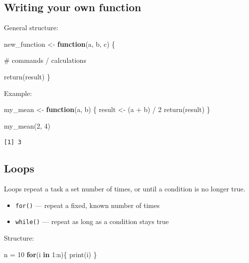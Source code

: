 \documentclass[
  letterpaper,
  DIV=11,
  numbers=noendperiod]{scrartcl}
\newenvironment{Shaded}{\begin{snugshade}}{\end{snugshade}}
\newcommand{\CommentTok}[1]{\textcolor[rgb]{0.37,0.37,0.37}{#1}}
\newcommand{\ControlFlowTok}[1]{\textcolor[rgb]{0.00,0.23,0.31}{\textbf{#1}}}
\newcommand{\DecValTok}[1]{\textcolor[rgb]{0.68,0.00,0.00}{#1}}
\newcommand{\FunctionTok}[1]{\textcolor[rgb]{0.28,0.35,0.67}{#1}}
\newcommand{\NormalTok}[1]{\textcolor[rgb]{0.00,0.23,0.31}{#1}}
\newcommand{\OtherTok}[1]{\textcolor[rgb]{0.00,0.23,0.31}{#1}}
\newcommand{\SpecialCharTok}[1]{\textcolor[rgb]{0.37,0.37,0.37}{#1}}
\providecommand{\tightlist}{%
  \setlength{\itemsep}{0pt}\setlength{\parskip}{0pt}}
\begin{document}
\subsection{Writing your own function}\label{writing-your-own-function}

General structure:

\begin{Shaded}
\begin{Highlighting}[]
\NormalTok{new\_function }\OtherTok{\textless{}{-}} \ControlFlowTok{function}\NormalTok{(a, b, c) \{}

  \CommentTok{\# commands / calculations}

  \FunctionTok{return}\NormalTok{(result)}
\NormalTok{\}}
\end{Highlighting}
\end{Shaded}

Example:

\begin{Shaded}
\begin{Highlighting}[]
\NormalTok{my\_mean }\OtherTok{\textless{}{-}} \ControlFlowTok{function}\NormalTok{(a, b) \{}
\NormalTok{  result }\OtherTok{\textless{}{-}}\NormalTok{ (a }\SpecialCharTok{+}\NormalTok{ b) }\SpecialCharTok{/} \DecValTok{2}
  \FunctionTok{return}\NormalTok{(result)}
\NormalTok{\}}

\FunctionTok{my\_mean}\NormalTok{(}\DecValTok{2}\NormalTok{, }\DecValTok{4}\NormalTok{)}
\end{Highlighting}
\end{Shaded}

\begin{verbatim}
[1] 3
\end{verbatim}

\subsection{Loops}\label{loops}

Loops repeat a task a set number of times, or until a condition is no
longer true.

\begin{itemize}
\tightlist
\item
  \texttt{for()} --- repeat a fixed, known number of times
\item
  \texttt{while()} --- repeat as long as a condition stays true
\end{itemize}

Structure:

\begin{Shaded}
\begin{Highlighting}[]
\NormalTok{n }\OtherTok{=} \DecValTok{10}
\ControlFlowTok{for}\NormalTok{(i }\ControlFlowTok{in} \DecValTok{1}\SpecialCharTok{:}\NormalTok{n)\{}
  \FunctionTok{print}\NormalTok{(i)}
\NormalTok{\}}
\end{Highlighting}
\end{Shaded}
\end{document}
